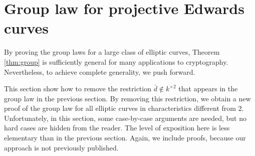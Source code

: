 \documentclass{llncs}
\begin{document}



\section{Group law for projective Edwards curves}\label{sec:proj}

By proving the group laws for a large class of elliptic curves,
Theorem \ref{thm:group} is sufficiently general for many applications
to cryptography.  Nevertheless, to achieve complete generality, we
push forward.

This section show how to remove the restriction $\bar d\not\in
k^{\times 2}$ that appears in the group law in the previous section.
By removing this restriction, we obtain a new proof of the group law
for all elliptic curves in characteristics different from $2$.
Unfortunately, in this section, some case-by-case arguments are
needed, but no hard cases are hidden from the reader.  The level of
exposition here is less elementary than in the previous section.
Again, we include proofs, because our approach is not previously published.
\end{document}
